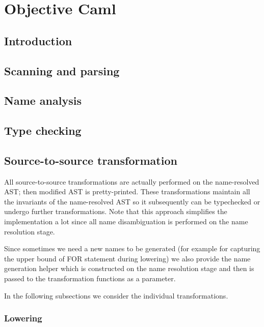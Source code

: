 \section{Objective Caml}

\cite{OcamlDef, PV, PVReuse, Exproblem, Remy, Monads, MonadicParserCombinators}

\subsection{Introduction}

\subsection{Scanning and parsing}

\subsection{Name analysis}

\subsection{Type checking}

\subsection{Source-to-source transformation}

All source-to-source transformations are actually performed on the name-resolved AST; then
modified AST is pretty-printed. These transformations maintain all the invariants of
the name-resolved AST so it subsequently can be typechecked or undergo further 
transformations. Note that this approach simplifies the implementation a lot since all name 
disambiguation is performed on the name resolution stage.

Since sometimes we need a new names to be generated (for example for capturing the upper bound of
FOR statement during lowering) we also provide the name generation helper which is constructed
on the name resolution stage and then is passed to the transformation functions as a parameter.

In the following subsections we consider the individual transformations.

\subsubsection{Lowering}

